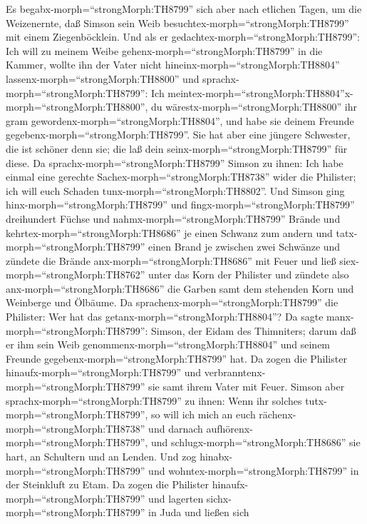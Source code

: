 Es begabx-morph=``strongMorph:TH8799'' sich aber nach
etlichen Tagen, um die Weizenernte, daß Simson sein Weib
besuchtex-morph=``strongMorph:TH8799'' mit einem Ziegenböcklein. Und als
er gedachtex-morph=``strongMorph:TH8799'': Ich will zu meinem Weibe
gehenx-morph=``strongMorph:TH8799'' in die Kammer, wollte ihn der Vater
nicht hineinx-morph=``strongMorph:TH8804''
lassenx-morph=``strongMorph:TH8800''  und
sprachx-morph=``strongMorph:TH8799'': Ich
meintex-morph=``strongMorph:TH8804''x-morph=``strongMorph:TH8800'', du
wärestx-morph=``strongMorph:TH8800'' ihr gram
gewordenx-morph=``strongMorph:TH8804'', und habe sie deinem Freunde
gegebenx-morph=``strongMorph:TH8799''. Sie hat aber eine jüngere
Schwester, die ist schöner denn sie; die laß dein
seinx-morph=``strongMorph:TH8799'' für diese.  Da
sprachx-morph=``strongMorph:TH8799'' Simson zu ihnen: Ich habe einmal
eine gerechte Sachex-morph=``strongMorph:TH8738'' wider die Philister;
ich will euch Schaden tunx-morph=``strongMorph:TH8802''. 
Und Simson ging hinx-morph=``strongMorph:TH8799'' und
fingx-morph=``strongMorph:TH8799'' dreihundert Füchse und
nahmx-morph=``strongMorph:TH8799'' Brände und
kehrtex-morph=``strongMorph:TH8686'' je einen Schwanz zum andern und
tatx-morph=``strongMorph:TH8799'' einen Brand je zwischen zwei Schwänze
 und zündete die Brände anx-morph=``strongMorph:TH8686'' mit
Feuer und ließ siex-morph=``strongMorph:TH8762'' unter das Korn der
Philister und zündete also anx-morph=``strongMorph:TH8686'' die Garben
samt dem stehenden Korn und Weinberge und Ölbäume.  Da
sprachenx-morph=``strongMorph:TH8799'' die Philister: Wer hat das
getanx-morph=``strongMorph:TH8804''? Da sagte
manx-morph=``strongMorph:TH8799'': Simson, der Eidam des Thimniters;
darum daß er ihm sein Weib genommenx-morph=``strongMorph:TH8804'' und
seinem Freunde gegebenx-morph=``strongMorph:TH8799'' hat. Da zogen die
Philister hinaufx-morph=``strongMorph:TH8799'' und
verbranntenx-morph=``strongMorph:TH8799'' sie samt ihrem Vater mit
Feuer.  Simson aber sprachx-morph=``strongMorph:TH8799'' zu
ihnen: Wenn ihr solches tutx-morph=``strongMorph:TH8799'', so will ich
mich an euch rächenx-morph=``strongMorph:TH8738'' und darnach
aufhörenx-morph=``strongMorph:TH8799'',  und
schlugx-morph=``strongMorph:TH8686'' sie hart, an Schultern und an
Lenden. Und zog hinabx-morph=``strongMorph:TH8799'' und
wohntex-morph=``strongMorph:TH8799'' in der Steinkluft zu Etam.
 Da zogen die Philister hinaufx-morph=``strongMorph:TH8799''
und lagerten sichx-morph=``strongMorph:TH8799'' in Juda und ließen sich
